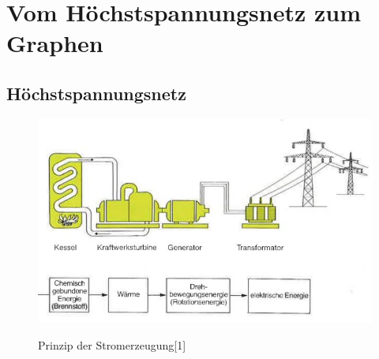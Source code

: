 
\chapter{Vom Höchstspannungsnetz zum Graphen}
\label{Kapitel 2}
%

\section{Höchstspannungsnetz}
\label{Höchstspannungsnetz}
%
\begin{figure}[t]
	\centering
	{\includegraphics[scale=0.9]{bilder/pds}\label{fig_pds}
	}\\
	\caption[Prinzip der Stromerzeugung]{Prinzip der Stromerzeugung[1]}
	\label{fig_pds}
\end{figure}

